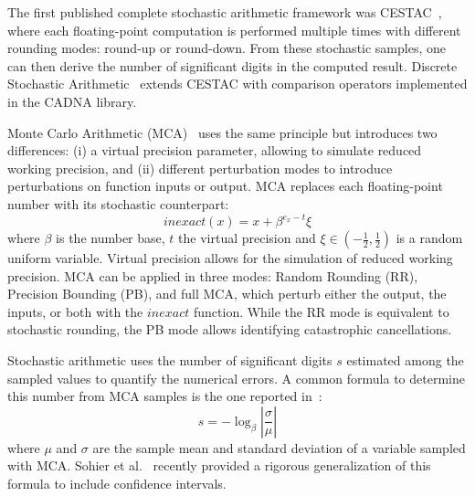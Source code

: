 \documentclass[11pt]{article}
\newcommand{\tristan}[1]{\color{orange}\textbf{From Tristan:} #1\color{black}\xspace}
\begin{document}
The first published complete stochastic arithmetic framework was CESTAC~\cite{vignes1993stochastic}, where each floating-point computation is performed multiple times with different rounding modes: round-up or round-down. From these stochastic samples, one can then derive the number of significant digits in the computed result. Discrete Stochastic Arithmetic~\cite{vignes2004discrete} extends CESTAC with comparison operators implemented in the CADNA library.

Monte Carlo Arithmetic (MCA)~\cite{parker1997monte} uses the same principle but introduces two differences:
(i) a virtual precision parameter, allowing to simulate reduced working precision,  and (ii) different perturbation modes to introduce perturbations
on function inputs or output.
MCA replaces each floating-point number with its stochastic counterpart:
\[
inexact(x) =  x + \beta^{e_x - t}\xi
\]
where $\beta$ is the number base, $t$ the virtual precision and $\xi \in (-\frac{1}{2},\frac{1}{2})$ is a random uniform variable.
Virtual precision allows for the simulation of reduced working precision.
MCA can be applied in three modes: Random Rounding (RR), Precision Bounding (PB), and full MCA, which perturb either the output, the inputs, or both with the $inexact$ function. While the RR mode is equivalent to stochastic rounding, the PB mode allows identifying catastrophic cancellations.

Stochastic arithmetic uses the number of significant digits $s$ estimated among the sampled values to quantify the numerical errors.
A common formula to determine this number from MCA samples is the one reported in~\cite{parker1997monte}:
\begin{equation}
s = -\log_{\beta}{ \left| \dfrac{\sigma}{\mu} \right|} \label{eq:sig-digits}
\end{equation}
where $\mu$ and $\sigma$ are the sample mean and standard deviation of a variable sampled with MCA.  
Sohier et al.~\cite{sohier2018confidence} recently provided a rigorous generalization of this formula to include confidence intervals.

\end{document}

